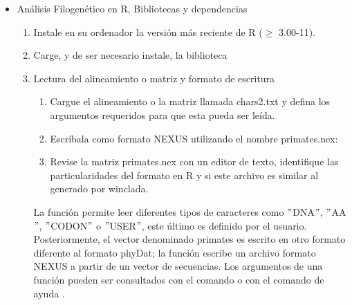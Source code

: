 \begin{itemize}
\begin{enumerate}
\end{enumerate}

  
\item An\'alisis Filogen\'etico en R, Bibliotecas y dependencias

\begin{enumerate}
  \item Instale en su ordenador la versi\'on m\'as reciente de R ($\ge$ 3.00-11). 
  \item Carge, y de ser necesario instale,  la biblioteca 
  \item{Lectura del alineamiento o matriz y formato de escritura}
  \begin{enumerate}
    \item   Cargue el alineamiento o la matriz llamada chars2.txt  y defina los argumentos requeridos para que esta pueda ser le\'ida. 
    \item Escr\'ibala como formato NEXUS utilizando el nombre primates.nex:
    \item Revise la matriz primates.nex con un editor de texto,  identifique las particularidades del formato en R y si este archivo es similar al generado por winclada.
  \end{enumerate}


La funci\'on  permite leer diferentes tipos de caracteres como $"$DNA$"$,  $"$AA$"$,  $"$CODON$"$ o $"$USER$"$,  este \'ultimo es definido por el usuario. Posteriormente, el vector denominado primates es escrito en otro formato diferente al formato phyDat; la funci\'on  escribe un archivo formato NEXUS a partir de un vector de secuencias. Los argumentos de una funci\'on pueden ser consultados con el comando  o con el comando de ayuda .


{}


\end{enumerate}
\end{itemize}
